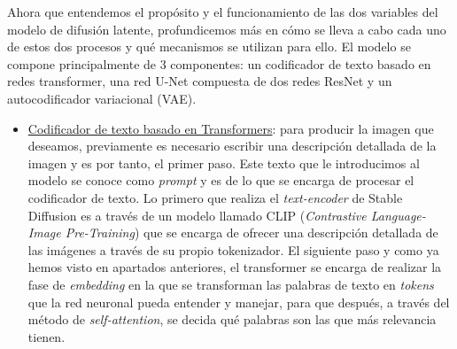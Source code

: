 Ahora que entendemos el propósito y el funcionamiento de las dos variables del modelo de difusión latente, profundicemos más en cómo se lleva a cabo cada uno de estos dos procesos y qué mecanismos se utilizan para ello. El modelo se compone principalmente de 3 componentes: un codificador de texto basado en redes transformer, una red U-Net compuesta de dos redes ResNet y un autocodificador variacional (VAE).\\
\begin{itemize}
	\item \underline{Codificador de texto basado en Transformers}: para producir la imagen que deseamos, previamente es necesario escribir una descripción detallada de la imagen y es por tanto, el primer paso. Este texto que le introducimos al modelo se conoce como \textit{prompt} y es de lo que se encarga de procesar el codificador de texto.  Lo primero que realiza el \textit{text-encoder} de Stable Diffusion es a través de un modelo llamado CLIP (\textit{Contrastive Language-Image Pre-Training}) que se encarga de ofrecer una descripción detallada de las imágenes a través de su propio tokenizador. El siguiente paso y como ya hemos visto en apartados anteriores, el transformer se encarga de realizar la fase de \textit{embedding} en la que se transforman las palabras de texto en \textit{tokens} que la red neuronal pueda entender y manejar, para que después, a través del método de \textit{self-attention}, se decida qué palabras son las que más relevancia tienen.\\ 
	

\end{itemize}
